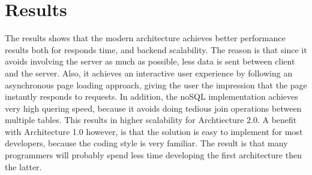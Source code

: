 
\section{Results}
The results shows that the modern architecture achieves better performance results both for responds time, and backend scalability. The reason is that since it avoids involving the server as much as possible, less data is sent between client and the server. Also, it achieves an interactive user experience by following an asynchronous page loading approach, giving the user the impression that the page instantly responds to requests. In addition, the noSQL implementation achieves very high quering speed, because it avoids doing tedious join operations between multiple tables. This results in higher scalability for Archtiecture 2.0. A benefit with Architecture 1.0 however, is that the solution is easy to implement for most developers, because the coding style is very familiar. The result is that many programmers will probably spend less time developing the first architecture then the latter. 

